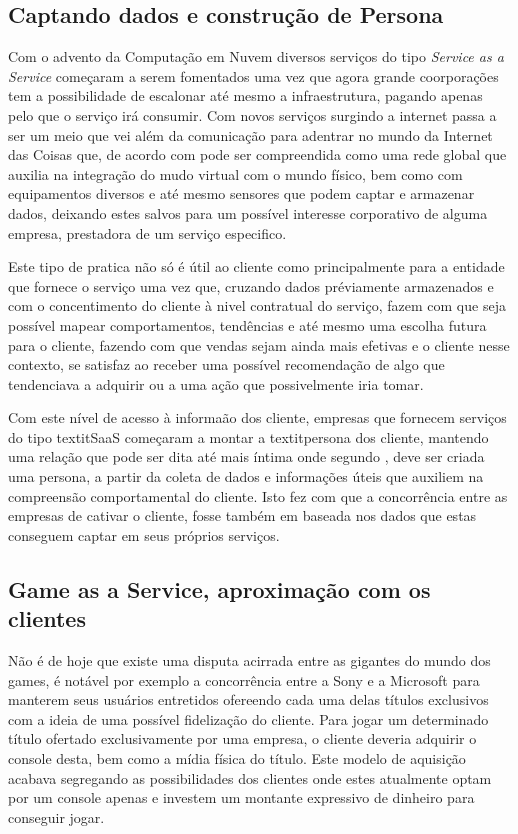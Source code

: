 \begin{justify}
    \section{Captando dados e construção de Persona}

    Com o advento da Computação em Nuvem diversos serviços do tipo \textit{Service as a Service}
    começaram a serem fomentados uma vez que agora grande coorporações tem a possibilidade de
    escalonar até mesmo a infraestrutura, pagando apenas pelo que o serviço irá consumir. Com novos
    serviços surgindo a internet passa a ser um meio que vei além da comunicação para adentrar no
    mundo da Internet das Coisas que, de acordo com \cite{albertin2017internet} pode ser
    compreendida como uma rede global que auxilia na integração do mudo virtual com o mundo físico,
    bem como com equipamentos diversos e até mesmo sensores que podem captar e armazenar dados,
    deixando estes salvos para um possível interesse corporativo de alguma empresa, prestadora de um
    serviço especifico.

    Este tipo de pratica não só é útil ao cliente como principalmente para a entidade que fornece
    o serviço uma vez que, cruzando dados préviamente armazenados e com o concentimento do cliente à
    nivel contratual do serviço, fazem com que seja possível mapear comportamentos, tendências e até
    mesmo uma escolha futura para o cliente, fazendo com que vendas sejam ainda mais efetivas e o
    cliente nesse contexto, se satisfaz ao receber uma possível recomendação de algo que tendenciava
    a adquirir ou a uma ação que possivelmente iria tomar.

    Com este nível de acesso à informaão dos cliente, empresas que fornecem serviços do tipo
    textit{SaaS} começaram a montar a textit{persona} dos cliente, mantendo uma relação que pode ser
    dita até mais íntima onde segundo \cite{dospersona}, deve ser criada uma persona, a partir da
    coleta de dados e informações úteis que auxiliem na compreensão comportamental do cliente. Isto
    fez com que a concorrência entre as empresas de cativar o cliente, fosse também em baseada nos
    dados que estas conseguem captar em seus próprios serviços.

    \subsection{Game as a Service, aproximação com os clientes}

    Não é de hoje que existe uma disputa acirrada entre as gigantes do mundo dos games, é notável
    por exemplo a concorrência entre a Sony e a Microsoft para manterem seus usuários entretidos
    ofereendo cada uma delas títulos exclusivos com a ideia de uma possível fidelização do
    cliente. Para jogar um determinado título ofertado exclusivamente por uma empresa, o cliente
    deveria adquirir o console desta, bem como a mídia física do título. Este modelo de aquisição
    acabava segregando as possibilidades dos clientes onde estes atualmente optam por um console
    apenas e investem um montante expressivo de dinheiro para conseguir jogar.


\end{justify}
